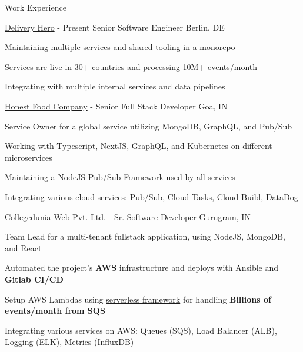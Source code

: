 \documentclass[../resume.tex]{subfiles}
\begin{document}
\begin{rSection}{Work Experience}

\begin{rSubsection}
    {\href{https://www.deliveryhero.com/}{Delivery Hero}}
    {  - Present }
    {Senior Software Engineer}
    {Berlin, DE}

    \item Maintaining multiple services and shared tooling in a monorepo
    \item Services are live in 30+ countries and processing 10M+ events/month
    \item Integrating with multiple internal services and data pipelines

\end{rSubsection}

\begin{rSubsection}
    {\href{https://go.rohit.page/hfc}{Honest Food Company}}
    {  -  }
    {Senior Full Stack Developer}
    {Goa, IN}

    \item Service Owner for a global service utilizing MongoDB, GraphQL, and Pub/Sub
    \item Working with Typescript, NextJS, GraphQL, and Kubernetes on different microservices
    \item Maintaining a \href{https://github.com/deliveryhero/hfc-pubsub}{NodeJS Pub/Sub Framework} used by all services
    \item Integrating various cloud services: Pub/Sub, Cloud Tasks, Cloud Build, DataDog

\end{rSubsection}

\begin{rSubsection}
    {\href{https://go.rohit.page/cd}{Collegedunia Web Pvt. Ltd.}}
    {  -  }
    {Sr. Software Developer}
    {Gurugram, IN}

    \item Team Lead for a multi-tenant fullstack application, using NodeJS, MongoDB, and React
    \item Automated the project's \textbf{AWS} infrastructure and deploys with Ansible and \textbf{Gitlab CI/CD}
    \item Setup AWS Lambdas using \href{https://www.serverless.com/}{serverless framework} for handling \textbf{Billions of events/month from SQS}
    \item Integrating various services on AWS: Queues (SQS), Load Balancer (ALB), Logging (ELK), Metrics (InfluxDB)


\end{rSubsection}
\end{rSection}
\end{document}
